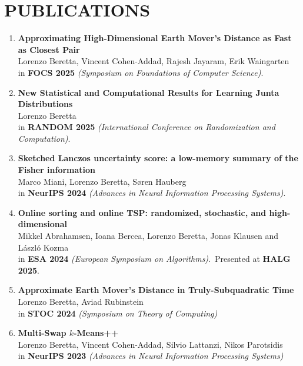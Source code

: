 \documentclass[paper=a4,fontsize=10pt]{scrartcl} %
\newcommand{\NewPart}[1]{\section*{\uppercase{#1}}}
\begin{document}
\NewPart{Publications}
\begingroup
\renewcommand{\section}[2]{}
% 
% 
\begin{enumerate}
    \item \textbf{Approximating High-Dimensional Earth Mover's Distance as Fast as Closest Pair}\\ 
  Lorenzo Beretta, Vincent Cohen-Addad, Rajesh Jayaram, Erik Waingarten \\
    in \textbf{FOCS 2025} \textit{(Symposium on Foundations of Computer Science)}.
    
    \item \textbf{New Statistical and Computational Results for Learning Junta Distributions}\\ 
  Lorenzo Beretta \\
    in \textbf{RANDOM 2025} \textit{(International Conference on Randomization and Computation)}.
    
    \item \textbf{Sketched Lanczos uncertainty score: a low-memory summary of the Fisher information}\\ 
  Marco Miani, Lorenzo Beretta, Søren Hauberg \\
    in \textbf{NeurIPS 2024} \textit{(Advances in Neural Information Processing Systems)}.

    \item \textbf{Online sorting and online TSP: randomized, stochastic, and high-dimensional}\\ 
    Mikkel Abrahamsen, Ioana Bercea, Lorenzo Beretta, Jonas Klausen and László Kozma \\
    in \textbf{ESA 2024} \textit{(European Symposium on Algorithms)}.\
    Presented at \textbf{HALG 2025}.
    
    \item \textbf{Approximate Earth Mover's Distance in Truly-Subquadratic Time} \\ 
    Lorenzo Beretta, Aviad Rubinstein \\
    in \textbf{STOC 2024} \textit{(Symposium on Theory of Computing)}
    
    \item \textbf{Multi-Swap $k$-Means++} \\
    Lorenzo Beretta, Vincent Cohen-Addad, Silvio Lattanzi, Nikos Parotsidis \\
    in \textbf{NeurIPS 2023} \textit{(Advances in Neural Information Processing Systems)}
    

\end{enumerate}
\end{document}
